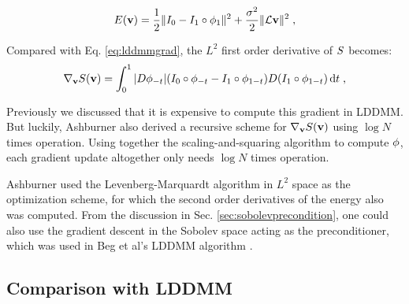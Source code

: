 \documentclass[letterpaper,12pt]{article}
\begin{document}
\begin{align}
E(\mathbf{v}) = \frac{1}{2} \| I_0 - I_1 \circ \phi_{1} \|^2 
+ 
\frac{\sigma^2}{2} \| \mathcal{L} \mathbf{v}\|^2  \;,
\label{eq:dartel}
\end{align}

Compared with Eq. \ref{eq:lddmmgrad}, the $L^2$ first order derivative of $S$ becomes:
\begin{align}
\nabla_{\mathbf{v}} S(\mathbf{v}) = \int_{0}^{1} 
|D\phi_{-t}|
(I_0 \circ \phi_{-t} - I_1 \circ \phi_{1-t})
D(I_1 \circ \phi_{1-t})
\, \text{d} t \; ,
\label{eq:dartelds}
\end{align}

Previously we discussed that it is expensive to compute this gradient in LDDMM. But luckily, Ashburner \cite{Ashburner2007} also derived a recursive scheme for $\nabla_{\mathbf{v}} S(\mathbf{v})$ using $\log N$ times operation. Using together the scaling-and-squaring algorithm to compute $\phi$, each gradient update altogether only needs $\log N$ times operation. 

Ashburner used the Levenberg-Marquardt algorithm in $L^2$ space as the optimization scheme, for which the second order derivatives of the energy also was computed. From the discussion in Sec. \ref{sec:sobolevprecondition}, one could also use the gradient descent in the Sobolev space acting as the preconditioner, which was used in Beg et al's LDDMM algorithm \cite{Beg2005Computing}. 

\subsection{Comparison with LDDMM}
\end{document}
